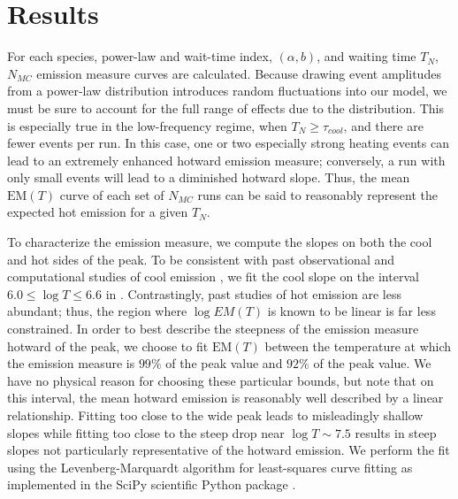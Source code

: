 \documentclass[tighten,apj]{emulateapj}
\begin{document}
	\section{Results}
	\label{sec:results}
	\par For each species, power-law and wait-time index, $(\alpha,b)$, and waiting time $T_N$, $N_{MC}$ emission measure curves are calculated. Because drawing event amplitudes from a power-law distribution introduces random fluctuations into our model, we must be sure to account for the full range of effects due to the distribution. This is especially true in the low-frequency regime, when $T_N\ge\tau_{cool}$, and there are fewer events per run. In this case, one or two especially strong heating events can lead to an extremely enhanced hotward emission measure; conversely, a run with only small events will lead to a diminished hotward slope. Thus, the mean $\mathrm{EM}(T)$ curve of each set of $N_{MC}$ runs can be said to reasonably represent the expected hot emission for a given $T_N$.
	\par To characterize the emission measure, we compute the slopes on both the cool and hot sides of the peak. To be consistent with past observational and computational studies of cool emission \citep[see][and references therein]{bradshaw_diagnosing_2012}, we fit the cool slope on the interval $6.0\le\log{T}\le6.6$ in . Contrastingly, past studies of hot emission are less abundant; thus, the region where $\log{EM(T)}$ is known to be linear is far less constrained. In order to best describe the steepness of the emission measure hotward of the peak, we choose to fit $\mathrm{EM}(T)$ between the temperature at which the emission measure is $99\%$ of the peak value and $92\%$ of the peak value. We have no physical reason for choosing these particular bounds, but note that on this interval, the mean hotward emission is reasonably well described by a linear relationship. Fitting too close to the wide peak leads to misleadingly shallow slopes while fitting too close to the steep drop near $\log{T}\sim7.5$ results in steep slopes not particularly representative of the hotward emission. We perform the fit using the Levenberg-Marquardt algorithm for least-squares curve fitting as implemented in the SciPy scientific Python package \citep{van_der_walt_numpy_2011}.
\end{document}
